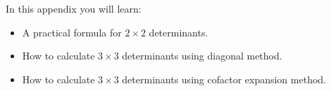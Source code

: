 \documentclass{workbook}
\begin{document}
\begin{appendix}
	In this appendix you will learn:
\begin{itemize}
  \item A practical formula for $2\times 2$ determinants.
  \item How to calculate $3\times 3$ determinants using diagonal method.
  \item How to calculate $3\times 3$ determinants using cofactor expansion method.
\end{itemize}



\end{appendix}

\begin{bookonly}


\end{bookonly}
\end{document}
